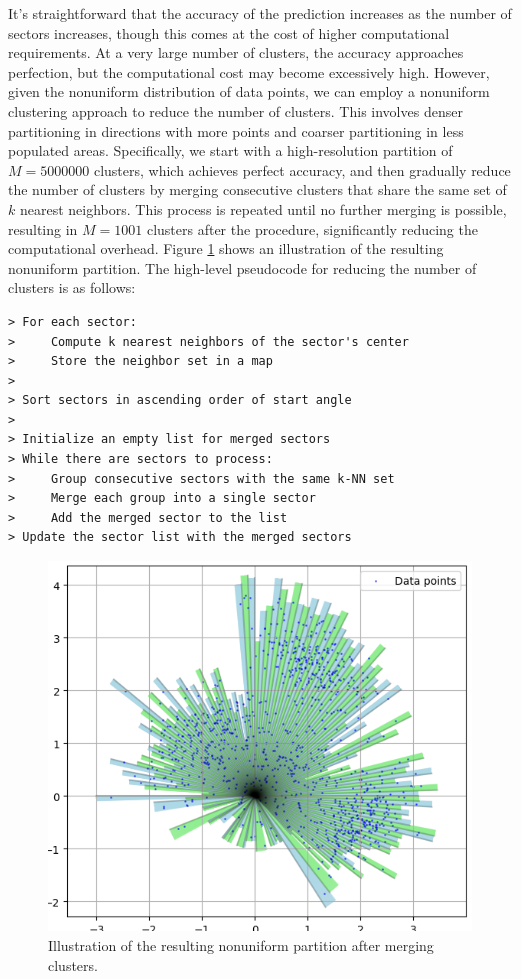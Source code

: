 \documentclass[article]{iacrtrans}
\begin{document}
It's straightforward that the accuracy of the prediction increases as the number of sectors increases, though this comes at the cost of higher computational requirements. At a very large number of clusters, the accuracy approaches perfection, but the computational cost may become excessively high. However, given the nonuniform distribution of data points, we can employ a nonuniform clustering approach to reduce the number of clusters. This involves denser partitioning in directions with more points and coarser partitioning in less populated areas. Specifically, we start with a high-resolution partition of $M=5000000$ clusters, which achieves perfect accuracy, and then gradually reduce the number of clusters by merging consecutive clusters that share the same set of $k$ nearest neighbors. This process is repeated until no further merging is possible, resulting in $M=1001$ clusters after the procedure, significantly reducing the computational overhead. Figure \ref{fig:angular_sectors2} shows an illustration of the resulting nonuniform partition. The high-level pseudocode for reducing the number of clusters is as follows:

\begin{lstlisting}
> For each sector:
>     Compute k nearest neighbors of the sector's center
>     Store the neighbor set in a map
> 
> Sort sectors in ascending order of start angle
> 
> Initialize an empty list for merged sectors
> While there are sectors to process:
>     Group consecutive sectors with the same k-NN set
>     Merge each group into a single sector
>     Add the merged sector to the list
> Update the sector list with the merged sectors
\end{lstlisting}

\begin{figure}
    \centering
    \includegraphics[width=0.5\linewidth]{figures_knn/angular_sectors.png}
    \caption{Illustration of the resulting nonuniform partition after merging clusters.}
    \label{fig:angular_sectors2}
\end{figure}
\end{document}
